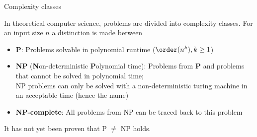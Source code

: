 \documentclass[11pt,compress,t,notes=noshow, xcolor=table]{beamer}
\begin{document}
\begin{vbframe}{Complexity classes}

In theoretical computer science, problems are divided into complexity classes. For an input size $n$ a distinction is made between

\begin{itemize}
\item \textbf{P}: Problems solvable in polynomial runtime ($\order(n^k), k\ge 1$)
\item \textbf{NP} (\textbf{N}on-deterministic \textbf{P}olynomial time): Problems from \textbf{P} and problems that cannot be solved in polynomial time;\\ NP problems can only be solved with a non-deterministic turing machine in an acceptable time (hence the name)
\item \textbf{NP-complete}: All problems from NP can be traced back to this problem
\end{itemize}

It has not yet been proven that P $\ne$ NP holds.

\end{vbframe}

\endlecture
\end{document}

